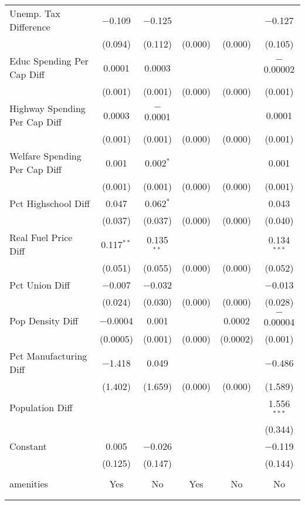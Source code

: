 \begin{table}[!htbp]
\begin{tabular}{@{\extracolsep{5pt}}lccccc}
  Unemp. Tax Difference & $-$0.109 & $-$0.125 &  &  & $-$0.127 \\ 
  & (0.094) & (0.112) & (0.000) & (0.000) & (0.105) \\ 
  Educ Spending Per Cap Diff & 0.0001 & 0.0003 &  &  & $-$0.00002 \\ 
  & (0.001) & (0.001) & (0.000) & (0.000) & (0.001) \\ 
  Highway Spending Per Cap Diff & 0.0003 & $-$0.0001 &  &  & 0.0001 \\ 
  & (0.001) & (0.001) & (0.000) & (0.000) & (0.001) \\ 
  Welfare Spending Per Cap Diff & 0.001 & 0.002$^{*}$ &  &  & 0.001 \\ 
  & (0.001) & (0.001) & (0.000) & (0.000) & (0.001) \\ 
  Pct Highschool Diff & 0.047 & 0.062$^{*}$ &  &  & 0.043 \\ 
  & (0.037) & (0.037) & (0.000) & (0.000) & (0.040) \\ 
  Real Fuel Price Diff & 0.117$^{**}$ & 0.135$^{**}$ &  &  & 0.134$^{***}$ \\ 
  & (0.051) & (0.055) & (0.000) & (0.000) & (0.052) \\ 
  Pct Union Diff & $-$0.007 & $-$0.032 &  &  & $-$0.013 \\ 
  & (0.024) & (0.030) & (0.000) & (0.000) & (0.028) \\ 
  Pop Density Diff & $-$0.0004 & 0.001 &  & 0.0002 & $-$0.00004 \\ 
  & (0.0005) & (0.001) & (0.000) & (0.0002) & (0.001) \\ 
  Pct Manufacturing Diff & $-$1.418 & 0.049 &  &  & $-$0.486 \\ 
  & (1.402) & (1.659) & (0.000) & (0.000) & (1.589) \\ 
  Population Diff &  &  &  &  & 1.556$^{***}$ \\ 
  &  &  &  &  & (0.344) \\ 
  Constant & 0.005 & $-$0.026 &  &  & $-$0.119 \\ 
  & (0.125) & (0.147) &  &  & (0.144) \\ 
 \hline \\[-1.8ex] 
amenities & Yes & No & Yes & No & No \\ 
\hline \\[-1.8ex] 
\hline 
\hline \\[-1.8ex] 
\end{tabular} 
\end{table} 
